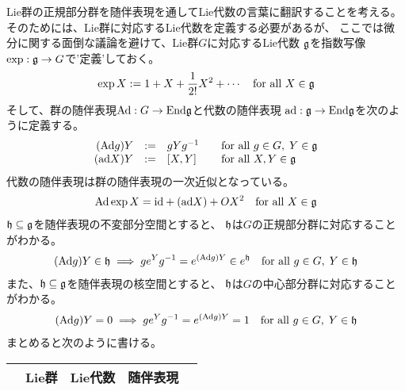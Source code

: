 {	Lie群の正規部分群を随伴表現を通してLie代数の言葉に翻訳することを考える。
	そのためには、Lie群に対応するLie代数を定義する必要があるが、
	ここでは微分に関する面倒な議論を避けて、Lie群$G$に対応するLie代数
	$\mathfrak{g}$を指数写像$\exp:\mathfrak{g}\to G$で'定義'しておく。
	\begin{equation*}\begin{split}
		\exp X := 1 + X + \frac{1}{2!}X^2 + \cdots
		\quad\text{for all } X\in\mathfrak{g}
	\end{split}\end{equation*}
	そして、群の随伴表現${\operatorname{Ad}}:G\to{\ensuremath{\operatorname{End}}}\mathfrak{g}$と代数の随伴表現
	${\operatorname{ad}}:\mathfrak{g}\to{\ensuremath{\operatorname{End}}}\mathfrak{g}$を次のように定義する。
	\begin{equation*}\begin{array}{rcll}
		({\operatorname{Ad}} g)Y &:=& gYg^{-1} & \quad\text{for all } g\in G,\; Y\in \mathfrak{g} \\
		({\operatorname{ad}} X)Y &:=& [X,Y] & \quad\text{for all } X,Y\in \mathfrak{g} \\
	\end{array}\end{equation*}
	代数の随伴表現は群の随伴表現の一次近似となっている。
	\begin{equation*}\begin{split}
		{\ensuremath{\operatorname{Ad}}}\exp X = {\operatorname{id}} + ({\operatorname{ad}} X) + OX^2 \quad\text{for all } X\in \mathfrak{g}
	\end{split}\end{equation*}
	$\mathfrak{h}\subseteq\mathfrak{g}$を随伴表現の不変部分空間とすると、
	$\mathfrak{h}$は$G$の正規部分群に対応することがわかる。
	\begin{equation*}\begin{split}
		({\operatorname{Ad}} g)Y\in \mathfrak{h} \implies ge^Yg^{-1} = e^{({\operatorname{Ad}} g)Y}\in e^{\mathfrak{h}}
		\quad\text{for all } g\in G,\; Y\in\mathfrak{h}
	\end{split}\end{equation*}
	また、$\mathfrak{h}\subseteq\mathfrak{g}$を随伴表現の核空間とすると、
	$\mathfrak{h}$は$G$の中心部分群に対応することがわかる。
	\begin{equation*}\begin{split}
		({\operatorname{Ad}} g)Y = 0 \implies ge^Yg^{-1} = e^{({\operatorname{Ad}} g)Y} = 1
		\quad\text{for all } g\in G,\; Y\in\mathfrak{h}
	\end{split}\end{equation*}
	まとめると次のように書ける。
	\begin{table}[htbp] %
		\begin{center}\begin{tabular}{ccccl} \hline
			& Lie群 & Lie代数 & 随伴表現 \\ \hline

\end{tabular}
\end{center}
\end{table}}
